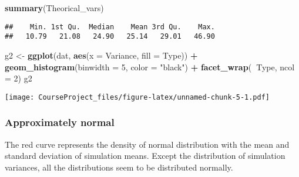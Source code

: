 \documentclass[]{article}
\newenvironment{Shaded}{\begin{snugshade}}{\end{snugshade}}
\newcommand{\KeywordTok}[1]{\textcolor[rgb]{0.13,0.29,0.53}{\textbf{#1}}}
\newcommand{\DataTypeTok}[1]{\textcolor[rgb]{0.13,0.29,0.53}{#1}}
\newcommand{\DecValTok}[1]{\textcolor[rgb]{0.00,0.00,0.81}{#1}}
\newcommand{\StringTok}[1]{\textcolor[rgb]{0.31,0.60,0.02}{#1}}
\newcommand{\OperatorTok}[1]{\textcolor[rgb]{0.81,0.36,0.00}{\textbf{#1}}}
\newcommand{\NormalTok}[1]{#1}
\begin{document}
\begin{Shaded}
\begin{Highlighting}[]
\KeywordTok{summary}\NormalTok{(Theorical_vars)}
\end{Highlighting}
\end{Shaded}

\begin{verbatim}
##    Min. 1st Qu.  Median    Mean 3rd Qu.    Max. 
##   10.79   21.08   24.90   25.14   29.01   46.90
\end{verbatim}

\begin{Shaded}
\begin{Highlighting}[]
\NormalTok{g2 <-}\StringTok{ }\KeywordTok{ggplot}\NormalTok{(dat, }\KeywordTok{aes}\NormalTok{(}\DataTypeTok{x =}\NormalTok{ Variance, }\DataTypeTok{fill =}\NormalTok{ Type)) }\OperatorTok{+}
\StringTok{  }\KeywordTok{geom_histogram}\NormalTok{(}\DataTypeTok{binwidth =} \DecValTok{5}\NormalTok{,  }\DataTypeTok{color =} \StringTok{"black"}\NormalTok{) }\OperatorTok{+}
\StringTok{  }\KeywordTok{facet_wrap}\NormalTok{(}\OperatorTok{~}\NormalTok{Type, }\DataTypeTok{ncol =} \DecValTok{2}\NormalTok{)}
\NormalTok{g2}
\end{Highlighting}
\end{Shaded}

\texttt{[image: CourseProject\_files/figure-latex/unnamed-chunk-5-1.pdf]}

\subsubsection{Approximately normal}\label{approximately-normal}

The red curve represents the density of normal distribution with the
mean and standard deviation of simulation means. Except the distribution
of simulation variances, all the distributions seem to be distributed
normally.
\end{document}
